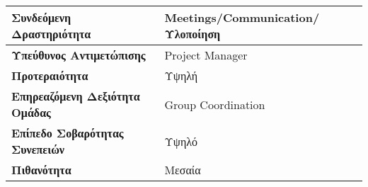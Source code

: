 \documentclass{article}
\newcommand\T{\rule{0pt}{2.6ex}}       %
\newcommand\B{\rule[-1.2ex]{0pt}{0pt}}
\begin{document}
  \begin{center}
     \begin{tabular}{|l|l|}
     \hline
      \textbf{Συνδεόμενη Δραστηριότητα} & Meetings/Communication/Υλοποίηση\T\B \\ 
      \hline
      \textbf{Υπεύθυνος Αντιμετώπισης} & Project Manager \T\B \\
      \hline
      \textbf{Προτεραιότητα} & Υψηλή\T\B \\
      \hline
      \textbf{Επηρεαζόμενη Δεξιότητα Ομάδας} & Group Coordination \T\B \\
      \hline
      \textbf{Επίπεδο Σοβαρότητας Συνεπειών} & Υψηλό\T\B \\
      \hline
      \textbf{Πιθανότητα} & Μεσαία \T\B \\
      \hline
     \end{tabular}
 \end{center}
 
\end{document}
